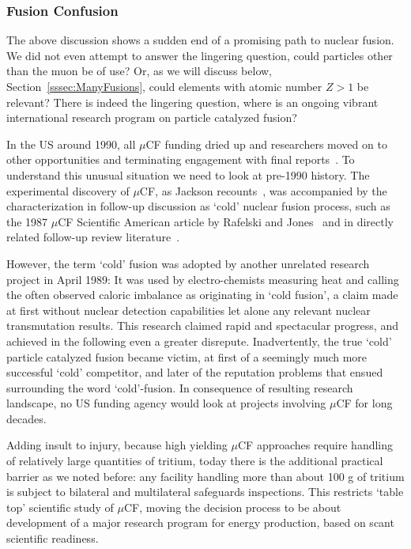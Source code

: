 \documentclass[particles,article,accept,pdftex,moreauthors]{Definitions/mdpi}
\newcommand{\rsec}[1]{Section~\ref{#1}}
\begin{document}
\subsubsection{Fusion Confusion}\label{ssec:conCF}
The above discussion shows a sudden end of a promising path to nuclear fusion. We did not even attempt to answer the lingering question, could particles other than the muon be of use? Or, as we will discuss below, \rsec{sssec:ManyFusions}, could elements with atomic number $Z>1$ be relevant? There is indeed the lingering question, where is an ongoing vibrant international research program on particle catalyzed fusion? 

In the US around 1990, all $\mu$CF funding dried up and researchers moved on to other opportunities and terminating engagement with final reports~\cite{Rafelski:1991DOE}. To understand this unusual situation we need to look at pre-1990 history. The experimental discovery of $\mu$CF, as Jackson recounts~\cite{Jackson:2010Rem}, was accompanied by the characterization in follow-up discussion as `cold' nuclear fusion process, such as the 1987 $\mu$CF Scientific American article by Rafelski and Jones~\cite{Rafelski:1987Jones} and in directly related follow-up review literature~\cite{Rafelski:1990gg}.

However, the term `cold' fusion was adopted by another unrelated research project in April 1989: It was used by electro-chemists measuring heat and calling the often observed caloric imbalance as originating in `cold fusion', a claim made at first without nuclear detection capabilities let alone any relevant nuclear transmutation results. This research claimed rapid and spectacular progress, and achieved in the following even a greater disrepute. Inadvertently, the true `cold' particle catalyzed fusion became victim, at first of a seemingly much more successful `cold' competitor, and later of the reputation problems that ensued surrounding the word `cold'-fusion. In consequence of resulting research landscape, no US funding agency would look at projects involving $\mu$CF for long decades.

Adding insult to injury, because high yielding $\mu$CF approaches require handling of relatively large quantities of tritium, today there is the additional practical barrier as we noted before: any facility handling more than about 100 g of tritium is subject to bilateral and multilateral safeguards inspections. This restricts `table top' scientific study of $\mu$CF, moving the decision process to be about development of a major research program for energy production, based on scant scientific readiness.
\end{document}
